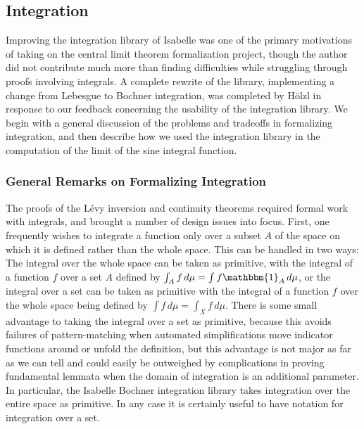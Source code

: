 \documentclass{article}
\theoremstyle{definition}
\begin{document}
\subsection{Integration}

Improving the integration library of Isabelle was one of the primary motivations of taking on the central limit theorem formalization project, though the author did not contribute much more than finding difficulties while struggling through proofs involving integrals. A complete rewrite of the library, implementing a change from Lebesgue to Bochner integration, was completed by H\"olzl in response to our feedback concerning the usability of the integration library. We begin with a general discussion of the problems and tradeoffs in formalizing integration, and then describe how we used the integration library in the computation of the limit of the sine integral function.

\subsubsection{General Remarks on Formalizing Integration} \label{sec:form_int}

The proofs of the L\'evy inversion and continuity theorems required formal work with integrals, and brought a number of design issues into focus. First, one frequently wishes to integrate a function only over a subset $A$ of the space on which it is defined rather than the whole space. This can be handled in two ways: The integral over the whole space can be taken as primitive, with the integral of a function $f$ over a set $A$ defined by $\int_A f \, d\mu = \int f \mathbbm{1}_A \, d\mu$, or the integral over a set can be taken as primitive with the integral of a function $f$ over the whole space being defined by $\int f \, d\mu = \int_X f \, d\mu$. There is some small advantage to taking the integral over a set as primitive, because this avoids failures of pattern-matching when automated simplifications move indicator functions around or unfold the definition, but this advantage is not major as far as we can tell and could easily be outweighed by complications in proving fundamental lemmata when the domain of integration is an additional parameter. In particular, the Isabelle Bochner integration library takes integration over the entire space as primitive. In any case it is certainly useful to have notation for integration over a set.
\end{document}
